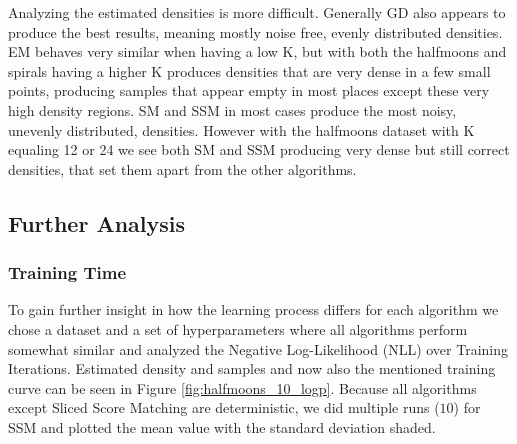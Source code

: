 Analyzing the estimated densities is more difficult. Generally GD also 
appears to produce the best results, meaning mostly noise free, evenly distributed densities. 
EM behaves very similar when having a low K, but with both the halfmoons and spirals 
having a higher K produces densities that are very dense in a few small points, producing samples
that appear empty in most places except these very high density regions. 
SM and SSM in most cases produce the most noisy, unevenly distributed, densities. However 
with the halfmoons dataset with K equaling 12 or 24 we see both SM and SSM producing 
very dense but still correct densities, that set them apart from the other algorithms.

\subsection{Further Analysis}
\label{sec:2d_exp2}

\subsubsection{Training Time}

To gain further insight in how the learning process differs for each algorithm we chose a dataset and a set of hyperparameters
where all algorithms perform somewhat similar and analyzed the Negative Log-Likelihood (NLL) over Training Iterations. 
Estimated density and samples and now also the mentioned training curve can be seen in Figure \ref{fig:halfmoons_10_logp}. Because all algorithms except Sliced Score Matching are deterministic, we did multiple runs ($10$) for SSM and plotted the mean value 
with the standard deviation shaded. 

